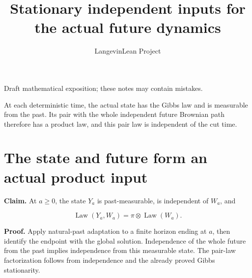 \documentclass[11pt,a4paper]{article}
\title{\texorpdfstring{Stationary independent inputs for the actual future dynamics}{Stationary independent inputs for the actual future dynamics}}
\author{LangevinLean Project}
\date{}
\begin{document}
\maketitle
Draft mathematical exposition; these notes may contain mistakes.


At each deterministic time, the actual state has the Gibbs law and is measurable from the past. Its pair with the whole independent future Brownian path therefore has a product law, and this pair law is independent of the cut time.


\section{\texorpdfstring{The state and future form an actual product input}{The state and future form an actual product input}}


\textbf{Claim.} At \(a\ge0\), the state \(Y_a\) is past-measurable, is independent of \(W_a\), and

\[\operatorname{Law}(Y_a,W_a)=\pi\otimes\operatorname{Law}(W_a).\]

\textbf{Proof.} Apply natural-past adaptation to a finite horizon ending at \(a\), then identify the endpoint with the global solution. Independence of the whole future from the past implies independence from this measurable state. The pair-law factorization follows from independence and the already proved Gibbs stationarity.
\end{document}
